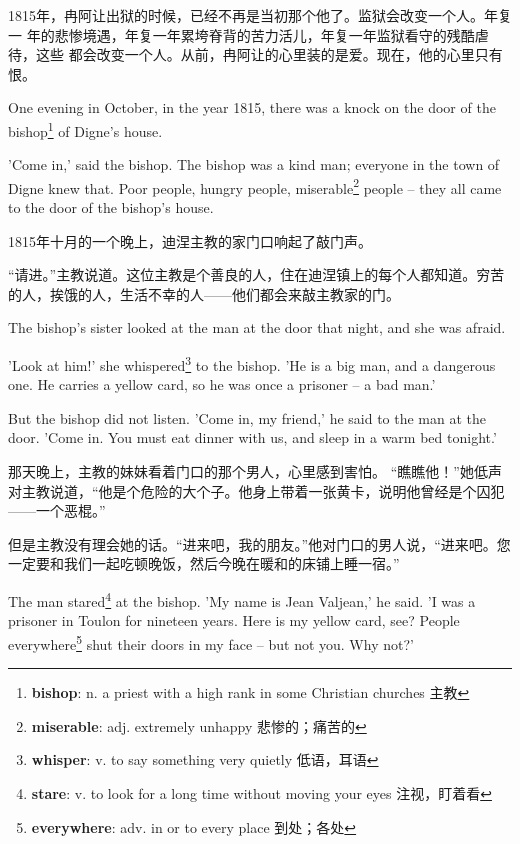 \documentclass[fontset=ubuntu, zihao=5]{ctexart}
\begin{document}
\begin{paracol}{2}
  1815年，冉阿让出狱的时候，已经不再是当初那个他了。监狱会改变一个人。年复一
  年的悲惨境遇，年复一年累垮脊背的苦力活儿，年复一年监狱看守的残酷虐待，这些
  都会改变一个人。从前，冉阿让的心里装的是爱。现在，他的心里只有
  恨。

  \switchcolumn*

  \sectionbreak

  One evening in October, in the year 1815, there was a knock on the door of
  the bishop\footnote{\textbf{bishop}: n. a priest with a high rank in some Christian churches 主教} of Digne's house.

  'Come in,' said the bishop. The bishop was a kind man; everyone in the town of Digne knew that. Poor people, hungry people, miserable\footnote{\textbf{miserable}: adj. extremely unhappy 悲惨的；痛苦的} people – they all came to the door of the bishop's house.

  \switchcolumn

  \sectionbreak

  1815年十月的一个晚上，迪涅主教的家门口响起了敲门声。

  “请进。”主教说道。这位主教是个善良的人，住在迪涅镇上的每个人都知道。穷苦
  的人，挨饿的人，生活不幸的人——他们都会来敲主教家的门。

  \switchcolumn*

  The bishop's sister looked at the man at the door that night, and she was afraid.

  'Look at him!' she whispered\footnote{\textbf{whisper}: v. to say something very quietly 低语，耳语} to the bishop. 'He is a big man, and a dangerous one. He carries a yellow card, so he was once a prisoner – a bad man.'

  But the bishop did not listen. 'Come in, my friend,' he said to the man at the door. 'Come in. You must eat dinner with us, and sleep in a warm bed tonight.'

  \switchcolumn

  那天晚上，主教的妹妹看着门口的那个男人，心里感到害怕。
  “瞧瞧他！”她低声对主教说道，“他是个危险的大个子。他身上带着一张黄卡，说明他曾经是个囚犯——一个恶棍。”


  但是主教没有理会她的话。“进来吧，我的朋友。”他对门口的男人说，“进来吧。您一定要和我们一起吃顿晚饭，然后今晚在暖和的床铺上睡一宿。”

  \switchcolumn*

  The man stared\footnote{\textbf{stare}: v. to look for a long time without moving your eyes 注视，盯着看} at the bishop. 'My name is Jean Valjean,' he said. 'I was a prisoner in Toulon for nineteen years. Here is my yellow card, see? People everywhere\footnote{\textbf{everywhere}: adv. in or to every place 到处；各处} shut their doors in my face – but not you. Why not?'


\end{paracol}
\end{document}
